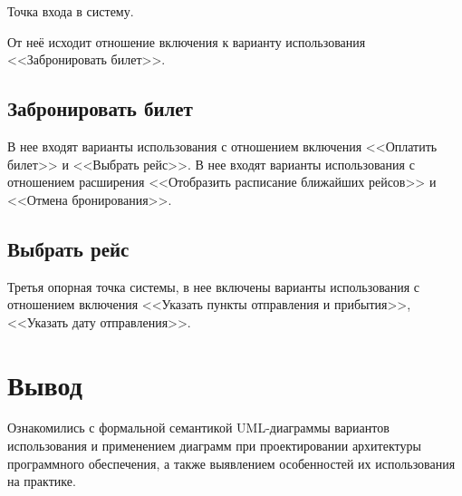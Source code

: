 Точка входа в систему. 

От неё исходит отношение включения к варианту использования <<Забронировать билет>>.

\subsection{Забронировать билет}
В нее входят варианты использования с отношением включения <<Оплатить билет>> и <<Выбрать рейс>>. В нее входят варианты использования с отношением расширения <<Отобразить расписание ближайших рейсов>> и <<Отмена бронирования>>.

\subsection{Выбрать рейс}

Третья опорная точка системы, в нее включены варианты использования с отношением включения <<Указать пункты отправления и прибытия>>, <<Указать дату отправления>>.

\section{Вывод}

Ознакомились с формальной семантикой UML-диаграммы вариантов использования и применением диаграмм при проектировании архитектуры программного обеспечения, а также выявлением особенностей их использования на практике.
